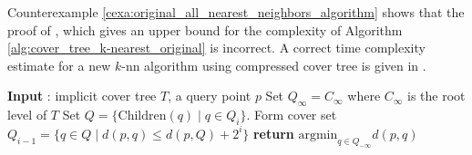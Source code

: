 \documentclass{vgtc}                          %
\numberwithin{algocf}{section}
\theoremstyle{definition}
\theoremstyle{definition}
\theoremstyle{definition}
\theoremstyle{plain}
\begin{document}
Counterexample \ref{cexa:original_all_nearest_neighbors_algorithm} shows that the proof of 
\cite[Theorem~5]{beygelzimer2006cover}, which gives an upper bound for the complexity of Algorithm \ref{alg:cover_tree_k-nearest_original} is incorrect. A correct time complexity estimate for a new $k$-nn algorithm using compressed cover tree is given in \cite[Corollary~3.84]{2205.10194}. 


\begin{algorithm}
	\caption{Copy-pasted \cite[Algorithm~1]{beygelzimer2006cover} based on an implicit cover tree $T$ \cite[Section~2]{beygelzimer2006cover} for nearest neighbor search, which is used in Counterexample \ref{cexa:original_all_nearest_neighbors_algorithm}. The children of a node $q$ of an implicit cover tree are defined as the nodes at one level below $q$ that have $q$ as their parent. In the actual implementation the loop in lines 3-6 runs only for the levels containing nodes with non-trivial children (not coinciding with their parents). 
	}
	\label{alg:cover_tree_k-nearest_original}
	\begin{algorithmic}[1]
		\STATE \textbf{Input} : implicit cover tree $T$, a query point $p$
		\STATE Set $Q_{\infty} = C_{\infty}$ where $C_{\infty}$ is the root level of $T$
		\STATE Set $Q = \{\text{Children}(q) \mid q \in Q_i\}.$
		\STATE Form cover set $Q_{i-1} = \{q \in Q \mid d(p,q) \leq d(p,Q) + 2^{i}\}$
		\ENDFOR
		\STATE \textbf{return} $\text{argmin}_{q \in Q_{-\infty}}d(p,q)$
	\end{algorithmic}
\end{algorithm}
\end{document}
